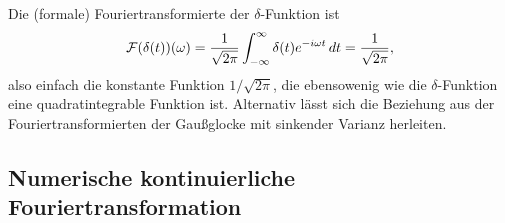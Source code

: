 Die (formale) Fouriertransformierte der $\delta$-Funktion ist
\begin{equation}
  \label{eq:fourierdelta}
  \mathcal F(\delta(t))(\omega)
  =
  \frac{1}{\sqrt{2\pi}}\int_{-\infty}^{\infty}
  \delta(t)e^{-i \omega t}\, dt = \frac{1}{\sqrt{2\pi}},
\end{equation}
also einfach die konstante Funktion $1/\sqrt{2\pi}$, die ebensowenig
wie die $\delta$-Funktion eine quadratintegrable Funktion
ist. Alternativ lässt sich die Beziehung aus der
Fouriertransformierten der Gaußglocke mit sinkender Varianz herleiten.

\subsection{Numerische kontinuierliche Fouriertransformation}
\label{sec:contdft}


